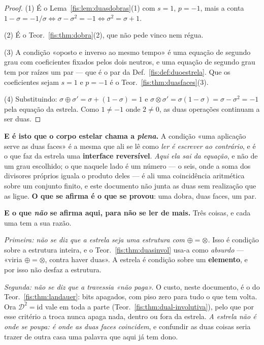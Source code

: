 \documentclass[livro.tex]{subfiles}
\begin{document}
\begin{proof}
(1) É o Lema~\ref{fis:lem:duasdobras}(1) com $s=1$, $p=-1$, mais a conta
$1-\sigma=-1/\sigma\iff\sigma-\sigma^{2}=-1\iff\sigma^{2}=\sigma+1$.

(2) É o Teor.~\ref{fis:thm:dobra}(2), que não pede vinco nem régua.

(3) A condição «oposto e inverso ao mesmo tempo» é uma equação de segundo grau
com coeficientes fixados pelos dois neutros, e uma equação de segundo grau tem
por raízes um par --- que é o par da Def.~\ref{fis:def:duoestrela}. Que os
coeficientes sejam $s=1$ e $p=-1$ é o Teor.~\ref{fis:thm:duasfaces}(3).

(4) Substituindo: $\sigma\oplus\sigma'=\sigma+(1-\sigma)=1$ e
$\sigma\otimes\sigma'=\sigma(1-\sigma)=\sigma-\sigma^{2}=-1$ pela equação da
estrela. Como $1\neq-1$ onde $2\neq0$, as duas operações continuam a ser duas.
\end{proof}

\medskip\noindent\textbf{E é isto que o corpo estelar chama a \emph{plena}.} A
condição «uma aplicação serve as duas faces» é a mesma que ali se lê como
\emph{ler é escrever ao contrário}, e é o que faz da estrela uma \textbf{interface
reversível}. \emph{Aqui ela sai da equação}, e não de um grau escolhido; o que
naquele lado é um número --- o seis, onde a soma dos divisores próprios iguala o
produto deles --- é ali uma coincidência aritmética sobre um conjunto finito, e
este documento não junta as duas sem realização que as ligue. \textbf{O que se
afirma é o que se provou}: uma dobra, duas faces, um par.

\medskip\noindent\textbf{E o que \emph{não} se afirma aqui, para não se ler de
mais.} Três coisas, e cada uma tem a sua razão.

\emph{Primeira: não se diz que a estrela seja uma estrutura com $\oplus=\otimes$.}
Isso é condição sobre a estrutura inteira, e o Teor.~\ref{fis:thm:duasinvol}
usa-a como \emph{absurdo} --- «viria $\oplus=\otimes$, contra haver duas». A
estrela é condição sobre um \textbf{elemento}, e por isso não desfaz a estrutura.

\emph{Segunda: não se diz que a travessia «não paga».} O custo, neste documento,
é o do Teor.~\ref{fis:thm:landauer}: bits apagados, com piso zero para tudo o que
tem volta. Ora $\mathcal{D}^{2}=\mathrm{id}$ vale em toda a parte
(Teor.~\ref{fis:thm:dual-involutiva}), pelo que por esse critério a troca nunca
apaga nada, dentro ou fora da estrela. \emph{A estrela não é onde se poupa: é
onde as duas faces coincidem}, e confundir as duas coisas seria trazer de outra
casa uma palavra que aqui já tem dono.
\end{document}
